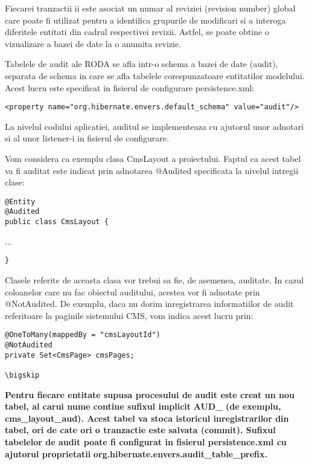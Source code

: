 \documentclass{article}
\begin{document}
Fiecarei tranzactii ii este asociat un numar al reviziei (revision number) global care poate fi utilizat pentru a identifica grupurile de modificari si a interoga diferitele entitati din cadrul respectivei revizii. Astfel, se poate obtine o vizualizare a bazei de date la o anumita revizie. \ 


\bigskip

Tabelele de audit ale RODA se afla intr-o schema a bazei de date (audit), separata de schema in care se afla tabelele corespunzatoare entitatilor modelului. Acest lucru este specificat in fisierul de configurare persistence.xml:


\bigskip

\begin{verbatim}
<property name="org.hibernate.envers.default_schema" value="audit"/>
\end{verbatim}

\bigskip

La nivelul codului aplicatiei, auditul se implementeaza cu ajutorul unor adnotari si al unor listener-i in fisierul de configurare.


\bigskip

Vom considera ca exemplu clasa CmsLayout a proiectului. Faptul ca acest tabel va fi auditat este indicat prin adnotarea @Audited specificata la nivelul intregii clase:


\bigskip

\begin{verbatim}
@Entity
@Audited
public class CmsLayout {
\end{verbatim}
...

\begin{verbatim}
}
\end{verbatim}

\bigskip

Clasele referite de aceasta clasa vor trebui sa fie, de asemenea, auditate. In cazul coloanelor care nu fac obiectul auditului, acestea vor fi adnotate prin @NotAudited. De exemplu, daca nu dorim inregistrarea informatiilor de audit referitoare la paginile sistemului CMS, vom indica acest lucru prin:


\bigskip

\begin{verbatim}
@OneToMany(mappedBy = "cmsLayoutId")
@NotAudited
private Set<CmsPage> cmsPages;

\bigskip

\end{verbatim}
\textbf{Pentru fiecare entitate supusa procesului de audit este creat un nou tabel, al carui nume contine sufixul implicit }\textbf{AUD\_ }\textbf{(de exemplu, }\textbf{cms\_layout\_aud}\textbf{). Acest tabel va stoca istoricul inregistrarilor din tabel, ori de cate ori o tranzactie este salvata (}\textbf{commit}\textbf{). Sufixul tabelelor de audit poate fi configurat in fisierul persistence.xml cu ajutorul proprietatii }\textbf{org.hibernate.envers.audit\_table\_prefix}\textbf{.}
\end{document}
